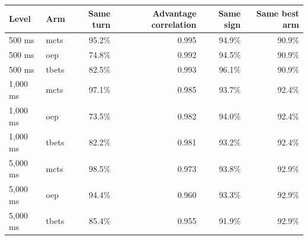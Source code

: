 \begin{tabular}{llrrrr}
\toprule
Level & Arm & Same turn & Advantage correlation & Same sign & Same best arm \\
\midrule
500 ms & mcts & 95.2\% & 0.995 & 94.9\% & 90.9\% \\
500 ms & oep & 74.8\% & 0.992 & 94.5\% & 90.9\% \\
500 ms & tbets & 82.5\% & 0.993 & 96.1\% & 90.9\% \\
1,000 ms & mcts & 97.1\% & 0.985 & 93.7\% & 92.4\% \\
1,000 ms & oep & 73.5\% & 0.982 & 94.0\% & 92.4\% \\
1,000 ms & tbets & 82.2\% & 0.981 & 93.2\% & 92.4\% \\
5,000 ms & mcts & 98.5\% & 0.973 & 93.8\% & 92.9\% \\
5,000 ms & oep & 94.4\% & 0.960 & 93.3\% & 92.9\% \\
5,000 ms & tbets & 85.4\% & 0.955 & 91.9\% & 92.9\% \\
\bottomrule
\end{tabular}
